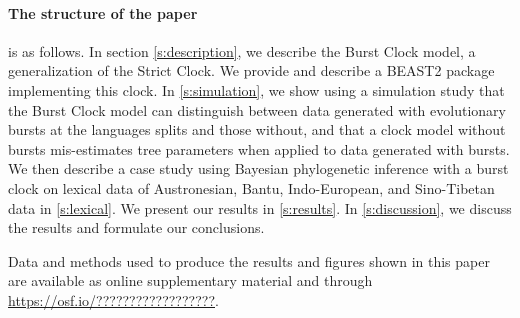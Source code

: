 \documentclass[a4paper,12pt]{scrartcl}
\begin{document}
\paragraph{The structure of the paper} is as follows. In section
\cref{s:description}, we describe the Burst Clock model, a generalization of
the Strict Clock. We provide and describe a BEAST2 \parencite{drummond2015bayesian} package
implementing this clock. In \cref{s:simulation}, we show using a simulation
study that the Burst Clock model can distinguish between data generated with
evolutionary bursts at the languages splits and those without, and that
a clock model without bursts mis-estimates tree parameters when applied to data
generated with bursts.
We then describe a case study using Bayesian phylogenetic inference
with a burst clock on
lexical data of Austronesian, Bantu, Indo-European, and Sino-Tibetan data in
\cref{s:lexical}.
We present our results in
\cref{s:results}. In \cref{s:discussion}, we discuss the results and formulate our conclusions.

Data and methods used to produce the results and figures shown in this paper are
available as online supplementary material and through
\url{https://osf.io/??????????????????}.
\end{document}
